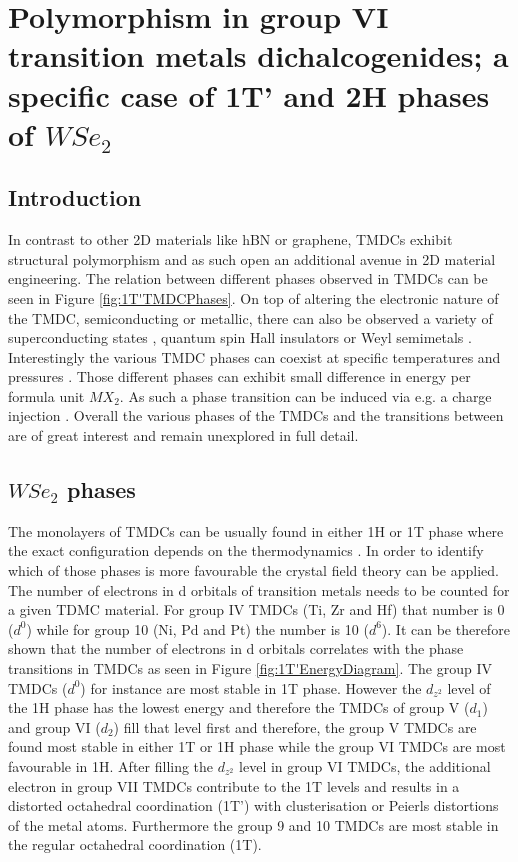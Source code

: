 \chapter{Polymorphism in group VI transition metals dichalcogenides; a specific case of 1T' and 2H phases of $WSe_2$}

\section{Introduction}
In contrast to other 2D materials like hBN or graphene, TMDCs exhibit structural polymorphism and as such open an additional avenue in 2D material engineering. The relation between different phases observed in TMDCs can be seen in Figure \ref{fig:1T'TMDCPhases}. On top of altering the electronic nature of the TMDC, semiconducting or metallic, there can also be observed a variety of superconducting states \cite{Saito2015}\cite{Lu2015}, quantum spin Hall insulators \cite{Qian2014}\cite{Choe2016}\cite{Liu2016a}\cite{Fei2017} or Weyl semimetals \cite{Sun2015}. Interestingly the various TMDC phases can coexist at specific temperatures and pressures \cite{Kappera2014}\cite{Keum2015}\cite{Cho2015}. Those different phases can exhibit small difference in energy per formula unit $MX_2$. As such a phase transition can be induced via e.g. a charge injection \cite{Duerloo2014}. Overall the various phases of the TMDCs and the transitions between are of great interest and remain unexplored in full detail.

\section{$WSe_2$ phases}
The monolayers of TMDCs can be usually found in either 1H or 1T phase where the exact configuration depends on the thermodynamics \cite{Keum2015}\cite{Cho2015}. In order to identify which of those phases is more favourable the crystal field theory can be applied. The number of electrons in d orbitals of transition metals needs to be counted for a given TDMC material. For group IV TMDCs (Ti, Zr and Hf) that number is 0 ($d^0$) while for group 10 (Ni, Pd and Pt) the number is 10 ($d^6$). It can be therefore shown that the number of electrons in d orbitals correlates with the phase transitions in TMDCs as seen in Figure \ref{fig:1T'EnergyDiagram}. The group IV TMDCs ($d^0$) for instance are most stable in 1T phase. However the $d_{z^2}$ level of the 1H phase has the lowest energy and therefore the TMDCs of group V ($d_1$) and group VI ($d_2$) fill that level first and therefore, the group V TMDCs are found most stable in  either 1T or 1H phase while the group VI TMDCs are most favourable in 1H. After filling the $d_{z^2}$ level in group VI TMDCs, the additional electron in group VII TMDCs contribute to the 1T levels and results in a distorted octahedral coordination (1T') with clusterisation or Peierls distortions of the metal atoms. Furthermore the group 9 and 10 TMDCs are most stable in the regular octahedral coordination (1T).

